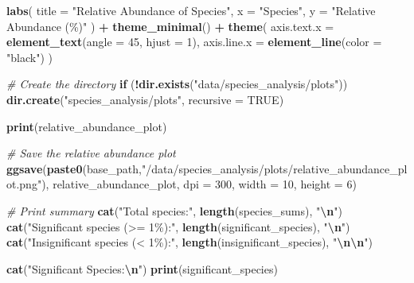 \documentclass[
]{article}
\newenvironment{Shaded}{\begin{snugshade}}{\end{snugshade}}
\newcommand{\AttributeTok}[1]{\textcolor[rgb]{0.13,0.29,0.53}{#1}}
\newcommand{\CommentTok}[1]{\textcolor[rgb]{0.56,0.35,0.01}{\textit{#1}}}
\newcommand{\ConstantTok}[1]{\textcolor[rgb]{0.56,0.35,0.01}{#1}}
\newcommand{\ControlFlowTok}[1]{\textcolor[rgb]{0.13,0.29,0.53}{\textbf{#1}}}
\newcommand{\DecValTok}[1]{\textcolor[rgb]{0.00,0.00,0.81}{#1}}
\newcommand{\FunctionTok}[1]{\textcolor[rgb]{0.13,0.29,0.53}{\textbf{#1}}}
\newcommand{\NormalTok}[1]{#1}
\newcommand{\SpecialCharTok}[1]{\textcolor[rgb]{0.81,0.36,0.00}{\textbf{#1}}}
\newcommand{\StringTok}[1]{\textcolor[rgb]{0.31,0.60,0.02}{#1}}
\begin{document}
\begin{Shaded}
\begin{Highlighting}[]
  \FunctionTok{labs}\NormalTok{(}
    \AttributeTok{title =} \StringTok{"Relative Abundance of Species"}\NormalTok{,}
    \AttributeTok{x =} \StringTok{"Species"}\NormalTok{,}
    \AttributeTok{y =} \StringTok{"Relative Abundance (\%)"}
\NormalTok{  ) }\SpecialCharTok{+}
  \FunctionTok{theme\_minimal}\NormalTok{() }\SpecialCharTok{+}
  \FunctionTok{theme}\NormalTok{(}
    \AttributeTok{axis.text.x =} \FunctionTok{element\_text}\NormalTok{(}\AttributeTok{angle =} \DecValTok{45}\NormalTok{, }\AttributeTok{hjust =} \DecValTok{1}\NormalTok{),}
    \AttributeTok{axis.line.x =} \FunctionTok{element\_line}\NormalTok{(}\AttributeTok{color =} \StringTok{"black"}\NormalTok{)}
\NormalTok{  )}

\CommentTok{\# Create the directory}
\ControlFlowTok{if}\NormalTok{ (}\SpecialCharTok{!}\FunctionTok{dir.exists}\NormalTok{(}\StringTok{"data/species\_analysis/plots"}\NormalTok{)) }\FunctionTok{dir.create}\NormalTok{(}\StringTok{"species\_analysis/plots"}\NormalTok{, }\AttributeTok{recursive =} \ConstantTok{TRUE}\NormalTok{)}


\FunctionTok{print}\NormalTok{(relative\_abundance\_plot)}

\CommentTok{\# Save the relative abundance plot}
\FunctionTok{ggsave}\NormalTok{(}\FunctionTok{paste0}\NormalTok{(base\_path,}\StringTok{"/data/species\_analysis/plots/relative\_abundance\_plot.png"}\NormalTok{), relative\_abundance\_plot, }\AttributeTok{dpi =} \DecValTok{300}\NormalTok{, }\AttributeTok{width =} \DecValTok{10}\NormalTok{, }\AttributeTok{height =} \DecValTok{6}\NormalTok{)}



\CommentTok{\# Print summary}
\FunctionTok{cat}\NormalTok{(}\StringTok{"Total species:"}\NormalTok{, }\FunctionTok{length}\NormalTok{(species\_sums), }\StringTok{"}\SpecialCharTok{\textbackslash{}n}\StringTok{"}\NormalTok{)}
\FunctionTok{cat}\NormalTok{(}\StringTok{"Significant species (\textgreater{}= 1\%):"}\NormalTok{, }\FunctionTok{length}\NormalTok{(significant\_species), }\StringTok{"}\SpecialCharTok{\textbackslash{}n}\StringTok{"}\NormalTok{)}
\FunctionTok{cat}\NormalTok{(}\StringTok{"Insignificant species (\textless{} 1\%):"}\NormalTok{, }\FunctionTok{length}\NormalTok{(insignificant\_species), }\StringTok{"}\SpecialCharTok{\textbackslash{}n\textbackslash{}n}\StringTok{"}\NormalTok{)}

\FunctionTok{cat}\NormalTok{(}\StringTok{"Significant Species:}\SpecialCharTok{\textbackslash{}n}\StringTok{"}\NormalTok{)}
\FunctionTok{print}\NormalTok{(significant\_species)}




\end{Highlighting}
\end{Shaded}
\end{document}

